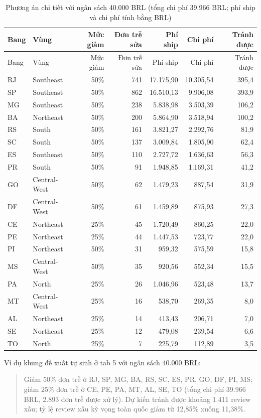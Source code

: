 \documentclass[12pt,a4paper]{report}
\renewcommand{\_}{\oldunderscore\allowbreak}
\begin{document}
\begingroup\small
\begin{longtable}{llrrrrr}
\caption{Phương án chi tiết với ngân sách 40.000 BRL (tổng chi phí 39.966 BRL; phí ship và chi phí tính bằng BRL)}\\
\toprule
Bang & Vùng & Mức giảm & Đơn trễ sửa & Phí ship & Chi phí & Tránh được \\
\midrule\endfirsthead
\toprule
Bang & Vùng & Mức giảm & Đơn trễ sửa & Phí ship & Chi phí & Tránh được \\
\midrule\endhead
RJ & Southeast & 50\% & 741 & 17.175,90 & 10.305,54 & 395,4 \\
SP & Southeast & 50\% & 862 & 16.510,13 & 9.906,08 & 393,9 \\
MG & Southeast & 50\% & 238 & 5.838,98 & 3.503,39 & 106,2 \\
BA & Northeast & 50\% & 200 & 5.864,90 & 3.518,94 & 100,2 \\
RS & South & 50\% & 161 & 3.821,27 & 2.292,76 & 81,9 \\
SC & South & 50\% & 137 & 3.009,84 & 1.805,90 & 62,4 \\
ES & Southeast & 50\% & 110 & 2.727,72 & 1.636,63 & 56,3 \\
PR & South & 50\% & 91 & 1.948,85 & 1.169,31 & 41,2 \\
GO & Central-West & 50\% & 62 & 1.479,23 & 887,54 & 31,9 \\
DF & Central-West & 50\% & 61 & 1.459,89 & 875,93 & 27,3 \\
CE & Northeast & 25\% & 45 & 1.720,49 & 860,25 & 22,0 \\
PE & Northeast & 25\% & 44 & 1.447,53 & 723,77 & 22,0 \\
PI & Northeast & 50\% & 31 & 959,32 & 575,59 & 15,8 \\
MS & Central-West & 50\% & 35 & 920,56 & 552,34 & 15,5 \\
PA & North & 25\% & 26 & 1.046,96 & 523,48 & 13,7 \\
MT & Central-West & 25\% & 16 & 538,70 & 269,35 & 8,0 \\
AL & Northeast & 25\% & 14 & 413,43 & 206,71 & 7,0 \\
SE & Northeast & 25\% & 12 & 479,08 & 239,54 & 6,6 \\
TO & North & 25\% & 7 & 225,79 & 112,89 & 3,5 \\
\bottomrule
\end{longtable}
\endgroup

Ví dụ khung đề xuất tự sinh ở tab 5 với ngân sách 40.000 BRL:
\begin{quote}\small
Giảm 50\% đơn trễ ở RJ, SP, MG, BA, RS, SC, ES, PR, GO, DF, PI, MS; giảm 25\% đơn trễ ở CE, PE, PA, MT, AL, SE, TO (tổng chi phí 39.966 BRL, 2.893 đơn trễ được xử lý). Dự kiến tránh được khoảng 1.411 review xấu; tỷ lệ review xấu kỳ vọng toàn quốc giảm từ 12,85\% xuống 11,38\%.
\end{quote}
\end{document}
